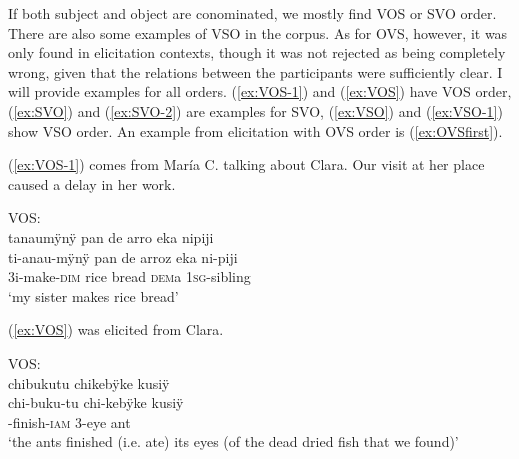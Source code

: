 If both subject and object are conominated, we mostly find VOS or SVO order. There are also some examples of VSO in the corpus. As for OVS, however, it was only found in elicitation contexts, though it was not rejected as being completely wrong, given that the relations between the participants were sufficiently clear. I will provide examples for all orders. (\ref{ex:VOS-1}) and (\ref{ex:VOS}) have VOS order, (\ref{ex:SVO}) and (\ref{ex:SVO-2}) are examples for SVO, (\ref{ex:VSO}) and (\ref{ex:VSO-1}) show VSO order. An example from elicitation with OVS order is (\ref{ex:OVSfirst}).


(\ref{ex:VOS-1}) comes from María C. talking about Clara. Our visit at her place caused a delay in her work. 

\ea\label{ex:VOS-1}
\begingl
\glpreamble  \textup{VOS:}\\ tanaumÿnÿ pan de arro eka nipiji\\
\gla ti-anau-mÿnÿ {pan de arroz} eka ni-piji\\
\glb 3i-make-\textsc{dim} {rice bread} \textsc{dem}a 1\textsc{sg}-sibling\\
\glft ‘my sister makes rice bread’
\endgl
\trailingcitation{[cux-120410ls.227]}
\xe





(\ref{ex:VOS}) was elicited from Clara.

\ea\label{ex:VOS}
\begingl 
\glpreamble  \textup{VOS:}\\chibukutu chikebÿke kusiÿ\\
\gla chi-buku-tu chi-kebÿke kusiÿ\\ 
-finish-\textsc{iam} 3-eye ant\\ 
\glft ‘the ants finished (i.e. ate) its eyes (of the dead dried fish that we found)’\\ 
\endgl
\trailingcitation{[cux-c120414ls-2.104]}
\xe


